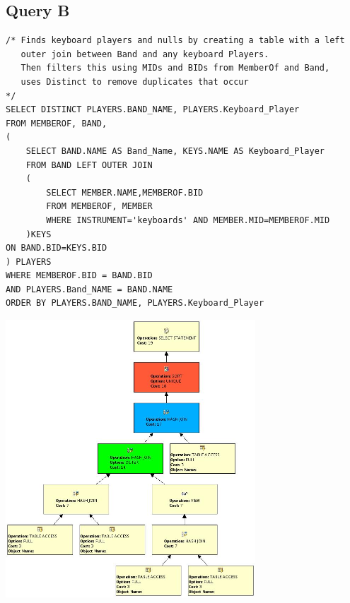 \documentclass{report}
\begin{document}
\subsection*{Query B}
\begin{verbatim}
/* Finds keyboard players and nulls by creating a table with a left
   outer join between Band and any keyboard Players.
   Then filters this using MIDs and BIDs from MemberOf and Band,
   uses Distinct to remove duplicates that occur
*/
SELECT DISTINCT PLAYERS.BAND_NAME, PLAYERS.Keyboard_Player
FROM MEMBEROF, BAND, 
(
    SELECT BAND.NAME AS Band_Name, KEYS.NAME AS Keyboard_Player
    FROM BAND LEFT OUTER JOIN 
    (
        SELECT MEMBER.NAME,MEMBEROF.BID
        FROM MEMBEROF, MEMBER
        WHERE INSTRUMENT='keyboards' AND MEMBER.MID=MEMBEROF.MID
    )KEYS
ON BAND.BID=KEYS.BID
) PLAYERS
WHERE MEMBEROF.BID = BAND.BID
AND PLAYERS.Band_NAME = BAND.NAME
ORDER BY PLAYERS.BAND_NAME, PLAYERS.Keyboard_Player
\end{verbatim}
\includegraphics[width=0.7\textwidth]{Q4B}
\end{document}
